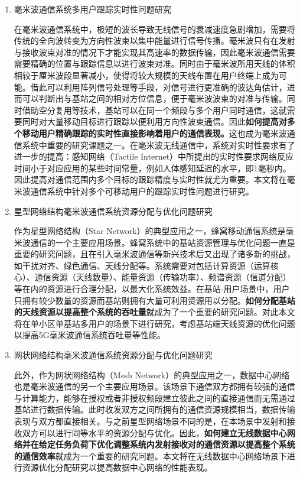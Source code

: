 \begin{enumerate}
	\item 毫米波通信系统多用户跟踪实时性问题研究

	在毫米波通信系统中，极短的波长导致无线信号的衰减速度急剧增加，需要将传统的全向波转变为方向性波束以集中能量进行信号传播。毫米波只有在发射与接收波束对准的情况下才能实现其高速率的数据传输，因此毫米波通信需要需要精确的位置与跟踪信息以进行波束对准。同时由于毫米波所用天线的体积相较于厘米波段显著减小，使得将较大规模的天线布置在用户终端上成为可能。借此可以利用阵列信号处理等手段，对信号进行更准确的波达角估计，进而可以判断出与基站之间的相对方位信息，便于毫米波波束的对准与传输。同时借助空分复用等技术，基站可以在同一个频段与多个用户同时通信，这就需要同时对大量移动目标进行跟踪以便利用方向性波束通信。因此\textbf{如何提高对多个移动用户精确跟踪的实时性直接影响着用户的通信表现。}这也成为毫米波通信系统中重要的研究课题之一。在毫米波无线通信中，系统对实时性要求有了进一步的提高：感知网络（Tactile Internet）中所提出的实时性要求网络反应时间小于对应应用的某些时间常量，例如人体感知延迟的水平，即1毫秒\cite{fettweis20145g}内。因此提高对通信范围内多个目标的跟踪精度与实时性就尤为重要。本文将在毫米波通信系统中针对多个可移动用户的跟踪实时性问题进行研究。

	\item 星型网络结构毫米波通信系统资源分配与优化问题研究

	作为星型网络结构（Star Network）的典型应用之一，蜂窝移动通信系统是毫米波通信的一个主要应用场景。蜂窝系统中的基站资源管理与优化问题一直是重要的研究问题，且在引入毫米波通信等新兴技术后又出现了诸多新的挑战，如干扰对齐、绿色通信、天线分配等。系统需要对包括计算资源（运算核心）、通信资源（天线数量）、能量资源（传输功率）、频谱资源（信道分配）等在内的资源进行合理分配，以最大化系统效益。在基站-用户场景中，用户只拥有较少数量的资源而基站则拥有大量可利用资源用以分配。\textbf{如何分配基站的天线资源以提高整个系统的吞吐量}就成为了一个重要的研究问题。对此本文将在单小区单基站多用户的场景下进行研究，考虑基站端天线资源的优化问题以提高5G毫米波通信系统吞吐量等性能。

	\item 网状网络结构毫米波通信系统资源分配与优化问题研究

	此外，作为网状网络结构（Mesh Network）的典型应用之一，数据中心网络也是毫米波通信的另一个主要应用场景。该场景下通信双方都拥有较强的通信与计算能力，能够在授权或者非授权频段建立彼此之间的直接通信而无需通过基站进行数据传输\cite{asadi2014survey}。此时收发双方之间所拥有的通信资源规模相当，数据传输表现与双方都直接相关。与之前星型网络场景不同的是，在本场景中发射和接收双方可以进行同等水平的资源分配与优化。因此，\textbf{如何建立无线数据中心网络并在给定任务负荷下优化调整系统内发射接收对的通信资源以提高整个系统的通信效率}就成为一个重要的研究问题。本文将在无线数据中心网络场景下进行资源优化分配研究以提高数据中心网络的性能表现。
\end{enumerate}

